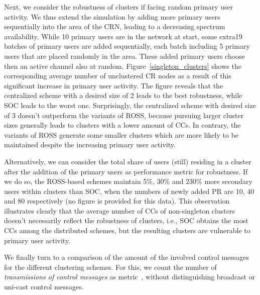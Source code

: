 \documentclass[times]{ettauth}
\newcommand{\ie}{i.e., }
\theoremstyle{mytheoremstyle}
\theoremstyle{mytheoremstyle}
\theoremstyle{mytheoremstyle}
\begin{document}
Next, we consider the robustness of clusters if facing random primary user activity.
We thus extend the simulation by adding more primary users sequentially into the area of the CRN, leading to a decreasing spectrum availability.
While 10 primary users are in the network at start, some extra19 batches of primary users are added sequentially, each batch including 5 primary users that are placed randomly in the area.
These added primary users choose then an active channel also at random. 
Figure~\ref{singleton_clusters} shows the corresponding average number of unclustered CR nodes as a result of this significant increase in primary user activity. 
The figure reveals that the centralized scheme with a desired size of 2 leads to the best robustness, while SOC leads to the worst one.
Surprisingly, the centralized scheme with desired size of 3 doesn't outperform the variants of ROSS, because pursuing larger cluster sizes generally leads to clusters with a lower amount of CCs. 
In contrary, the variants of ROSS generate some smaller clusters which are more likely to be maintained despite the increasing primary user activity.

Alternatively, we can consider the total share of users (still) residing in a cluster after the addition of the primary users as performance metric for robustness.
If we do so, the ROSS-based schemes maintain 5\%, 30\% and 230\% more secondary users within clusters than SOC, when the numbers of newly added PR are 10, 40 and 80 respectively (no figure is provided for this data).
This observation illustrates clearly that the average number of CCs of non-singleton clusters doesn't necessarily reflect the robustness of clusters, \ie SOC obtains the most CCs among the distributed schemes, but the resulting clusters are vulnerable to primary user activity.

We finally turn to a comparison of the amount of the involved control messages for the different clustering schemes.
For this, we count the number of \textit{transmissions of control messages} as metric~\cite{complexity_aggregation_2011}, without distinguishing broadcast or uni-cast control messages.
\end{document}
